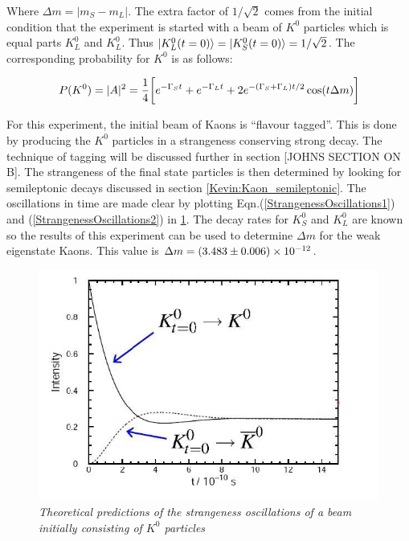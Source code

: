 \noindent Where $\Delta m = |m_{S} - m_{L}|$. The extra factor of $1/{\sqrt{2}}$ comes from the initial condition that the experiment is started with a beam of $K^{0}$ particles which is equal parts $K^{0}_{L}$ and $K^{0}_{L}$. Thus $\ket{K^{0}_{L}(t=0)} = \ket{K^{0}_{S}(t=0)} = 1/{\sqrt{2}}$. The corresponding probability for $K^{0}$ is as follows:

\begin{equation}\label{StrangenessOscillations2}
P({K}^{0}) = |{A}|^{2} = \frac{1}{4} \bigg[ e^{-\Gamma_{S}t} + e^{-\Gamma_{L}t} + 2 e^{-(\Gamma_{S} + \Gamma_{L})t/2} \cos(t \Delta m )\bigg] \\
\end{equation}

For this experiment, the initial beam of Kaons is ``flavour tagged''. This is done by producing the $K^{0}$ particles in a strangeness conserving strong decay. The technique of tagging will be discussed further in section [JOHNS SECTION ON B]. The strangeness of the final state particles is then determined by looking for semileptonic decays discussed in section \ref{Kevin:Kaon_semileptonic}. The oscillations in time are made clear by plotting Eqn.(\ref{StrangenessOscillations1}) and (\ref{StrangenessOscillations2}) in \cref{StrangenessOscillationsPic}. The decay rates for $K^{0}_{S}$ and $K^{0}_{L}$ are known so the results of this experiment can be used to determine $\Delta m$ for the weak eigenstate Kaons. This value is $\Delta m = (3.483 \pm 0.006) \times 10^{-12}$.       

\begin{figure}[h!]
\begin{center}
\includegraphics[scale=0.4]{figs/Strangeness_oscillations.png}
\end{center}
\caption{\textit{Theoretical predictions of the strangeness oscillations of a beam initially consisting of $K^{0}$ particles \cite{StrangenessPic}}}
\label{StrangenessOscillationsPic}
\end{figure}

